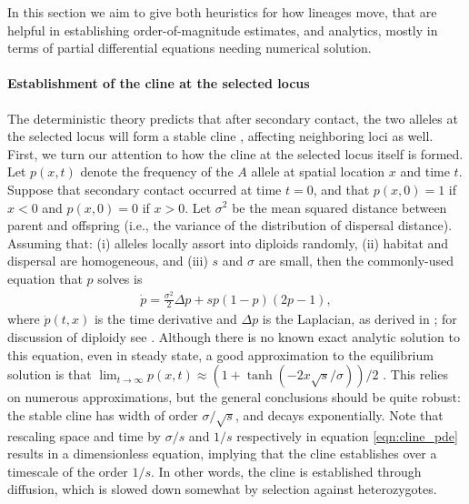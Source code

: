\documentclass[11pt,letterpaper]{article}
\newcommand{\alisa}[1]{{\em \color{red} #1}}
\newcommand{\plr}[1]{{\em \color{blue} #1}}
\begin{document}
In this section we aim to give both heuristics for how lineages move, 
that are helpful in establishing order-of-magnitude estimates,
and analytics, mostly in terms of partial differential equations needing numerical solution.

\paragraph{Establishment of the cline at the selected locus}
The deterministic theory predicts that after secondary contact,
the two alleles at the selected locus will form a stable cline \citep{Barton1979},
affecting neighboring loci as well.
First, we turn our attention to how the cline at the selected locus itself is formed.
Let $p(x,t)$ denote the frequency of the $A$ allele at spatial location $x$ and time $t$.  
Suppose that secondary contact occurred at time $t=0$, 
and that $p(x,0) = 1$ if $x<0$ and $p(x,0)=0$ if $x>0$.
Let $\sigma^2$ be the mean squared distance between parent and offspring 
(i.e., the variance of the distribution of dispersal distance).
Assuming that: (i) alleles locally assort into diploids randomly, 
(ii) habitat and dispersal are homogeneous, and 
(iii) $s$ and $\sigma$ are small, then the commonly-used equation that $p$ solves is
\begin{align} \label{eqn:cline_pde}
    \dot p = \frac{\sigma^2}{2} \Delta p + s p (1-p) (2p-1) ,
\end{align}
where $\dot p(t,x)$ is the time derivative and $\Delta p$ is the Laplacian,
as derived in \citet{Bazykin1969}; for discussion of diploidy see \citep{christiansen1995genotypic}.
Although there is no known exact analytic solution to this equation, even in steady state, 
a good approximation to the equilibrium solution is that
$\lim_{t \to \infty} p(x,t) \approx (1+\tanh(-2x\sqrt{s}/\sigma))/2$ \citep{Bazykin1969}. 
This relies on numerous approximations, but the general conclusions should be quite robust: 
the stable cline has width of order $\sigma/\sqrt{s}$, and decays exponentially. 
Note that rescaling space and time by $\sigma/s$ and $1/s$ respectively in equation \eqref{eqn:cline_pde} results in a dimensionless equation,
implying that the cline establishes over a timescale of the order $1/s$. 
In other words, the cline is established through diffusion, which is slowed down somewhat by selection against heterozygotes. 
\end{document}
